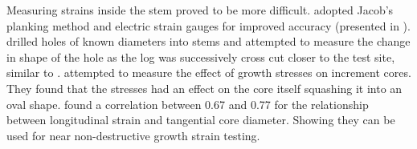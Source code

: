 Measuring strains inside the stem proved to be more difficult. \citet{kikata1972}
adopted Jacob's planking method and electric strain gauges for improved accuracy (presented in \citet{kubler_1987}).
\citet{wilhelmy1973probe} drilled holes of known diameters into stems and
attempted to measure the change in shape of the hole as the log was successively
cross cut closer to the test site, similar to \citet{boyd1950a}. \citet{ISI:A1979HU45700004}  attempted to measure the effect of growth stresses on increment cores.
They found that the stresses had an effect on the core itself
squashing it into an oval shape. \citet{FERRAND_1982} found a correlation between 0.67 and 0.77 for the relationship between
longitudinal strain and tangential core diameter. Showing
they can be used for near non-destructive growth strain testing.